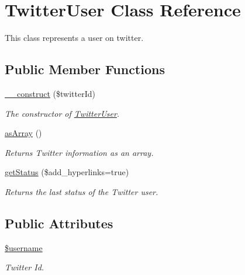 \hypertarget{class_twitter_user}{
\section{TwitterUser Class Reference}
\label{class_twitter_user}
}
This class represents a user on twitter.  


\subsection*{Public Member Functions}
\begin{CompactItemize}
\item 
\hyperlink{class_twitter_user_ac09b350e318425625ba5766fdd28118}{\_\-\_\-construct} (\$twitterId)
\begin{CompactList}\small\item\em The constructor of \hyperlink{class_twitter_user}{TwitterUser}. \item\end{CompactList}\item 
\hyperlink{class_twitter_user_0badd8e7ffdf4e7c30f4954d782efc21}{asArray} ()
\begin{CompactList}\small\item\em Returns Twitter information as an array. \item\end{CompactList}\item 
\hyperlink{class_twitter_user_dee94bac47124658a438a57f9ceb0fae}{getStatus} (\$add\_\-hyperlinks=true)
\begin{CompactList}\small\item\em Returns the last status of the Twitter user. \item\end{CompactList}\end{CompactItemize}
\subsection*{Public Attributes}
\begin{CompactItemize}
\item 
\hyperlink{class_twitter_user_344e34fc6dcf01c488347d4146cd8de9}{\$username}
\begin{CompactList}\small\item\em Twitter Id. \item\end{CompactList}\end{CompactItemize}


